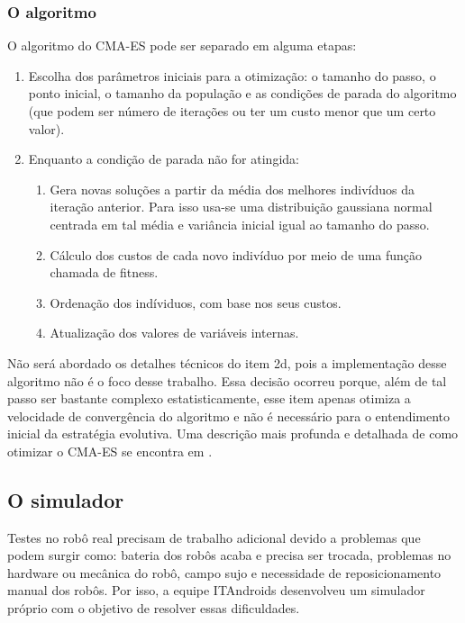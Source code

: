 \documentclass[a4paper,12pt]{article}
\begin{document}
\subsubsection{O algoritmo}

O algoritmo do CMA-ES pode ser separado em alguma etapas:

\begin{enumerate}
\item Escolha dos parâmetros iniciais para a otimização: o tamanho do passo, o ponto inicial, o tamanho da população e as condições de parada do algoritmo (que podem ser número de iterações ou ter um custo menor que um certo valor).
\item Enquanto a condição de parada não for atingida:
\begin{enumerate}
\item Gera novas soluções a partir da média dos melhores indivíduos da iteração anterior. Para isso usa-se uma distribuição gaussiana normal centrada em tal média e variância inicial igual ao tamanho do passo.
\item Cálculo dos custos de cada novo indivíduo por meio de uma função chamada de fitness.
\item Ordenação dos indíviduos, com base nos seus custos.
\item Atualização dos valores de variáveis internas.
\end{enumerate}
\end{enumerate}

Não será abordado os detalhes técnicos do item 2d, pois a implementação desse algoritmo não é o foco desse trabalho. Essa decisão ocorreu porque, além de tal passo ser bastante complexo estatisticamente, esse item apenas otimiza a velocidade de convergência do algoritmo e não é necessário para o entendimento inicial da estratégia evolutiva. Uma descrição mais profunda e detalhada de como otimizar o CMA-ES se encontra em \cite{CMA-ES}.

\subsection{O simulador}

Testes no robô real precisam de trabalho adicional devido a problemas que podem surgir como: bateria dos robôs acaba e precisa ser trocada, problemas no hardware ou mecânica do robô, campo sujo e necessidade de reposicionamento manual dos robôs. Por isso, a equipe ITAndroids desenvolveu um simulador próprio com o objetivo de resolver essas dificuldades.
\end{document}
